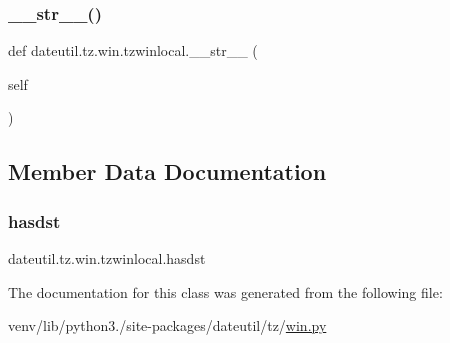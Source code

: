\subsubsection{\texorpdfstring{\+\_\+\+\_\+str\+\_\+\+\_\+()}{\_\_str\_\_()}}
{\footnotesize\ttfamily def dateutil.\+tz.\+win.\+tzwinlocal.\+\_\+\+\_\+str\+\_\+\+\_\+ (\begin{DoxyParamCaption}\item[{}]{self }\end{DoxyParamCaption})}



\subsection{Member Data Documentation}
\mbox{\label{classdateutil_1_1tz_1_1win_1_1tzwinlocal_a7682b0615eb960c3c2e1570012fbaf56}} 
\subsubsection{\texorpdfstring{hasdst}{hasdst}}
{\footnotesize\ttfamily dateutil.\+tz.\+win.\+tzwinlocal.\+hasdst}



The documentation for this class was generated from the following file\+:\begin{DoxyCompactItemize}
\item 
venv/lib/python3./site-\/packages/dateutil/tz/\hyperlink{win_8py}{win.\+py}\end{DoxyCompactItemize}
